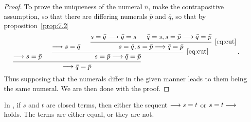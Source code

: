 \begin{proof}
    To prove the uniqueness of the numeral \(\bar n\),
    make the contrapositive assumption, so that
    there are differing numerals \(\bar p\) and \(\bar q\),
    so that by proposition~\ref{prop:7.2}
    \begin{equation*}
        \begin{prooftree}
            \hypo{\seq s = \bar p}
            \hypo{\seq s = \bar q}
            \hypo{s = \bar q\seq \bar q = s}
            \hypo{\bar q = s, s = \bar p\seq \bar q = \bar p}
            \infer2[\eqref{eq:cut}]{s = \bar q, s = \bar p\seq \bar q = \bar p}
            \infer2[\eqref{eq:cut}]{s = \bar p\seq \bar q = \bar p}
            \infer2{\seq \bar q = \bar p}
        \end{prooftree} \,.
    \end{equation*}
    Thus supposing that the numerals differ in the given manner
    leads to them being the same numeral. We are then done with
    the proof.
\end{proof}

\begin{proposition}[9.6.2]\label{prop:9.6.2}
    In \PA{}, if \(s\) and \(t\) are closed terms, then either
    the sequent \(\longrightarrow s=t\) or \(s=t\longrightarrow\) holds. The terms
    are either equal, or they are not.
\end{proposition}

